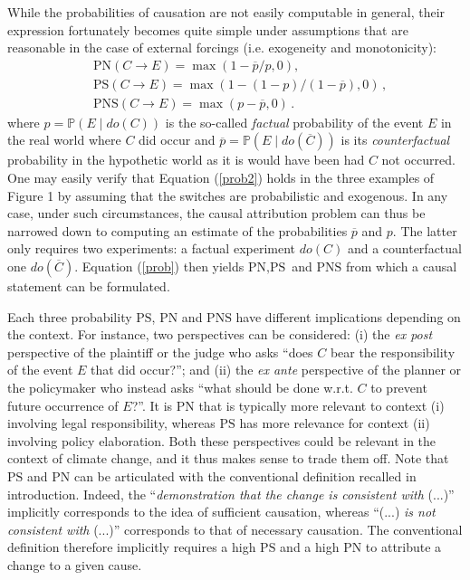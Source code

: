 \documentclass[12pt]{article}
\newcommand{\PN}{\textrm{PN}}
\newcommand{\DO}{do}
\newcommand{\PS}{\textrm{PS}}
\newcommand{\PNS}{\textrm{PNS}}
\newcommand{\Proba}{\mathbb P}
\begin{document}
While the probabilities of causation are not easily computable in general, their expression fortunately becomes quite simple under assumptions that are reasonable in the case of external forcings (i.e. exogeneity and monotonicity):
\begin{subequations}\label{prob2}
\begin{align}
& \textrm{PN}(C\rightarrow E) =\max \left(1 - \overline{p}/p, 0\right), \\%
& {\textrm{PS}}(C\rightarrow E) =\max \left(1- (1-p)/(1-\overline{p}), 0\right)\,, \\
& \textrm{PNS}(C\rightarrow E) = \max \left(p-\overline{p}, 0\right)\,.
\end{align}
\end{subequations}
where $p=\Proba(E\mid \DO(C))$ is the so-called \textit{factual} probability of the event $E$ in the real world where $C$ did occur and $\overline{p}=\Proba(E\mid \DO(\overline{C}))$ is its \textit{counterfactual} probability in the hypothetic world as it is would have been had $C$ not occurred. One may easily verify that Equation (\ref{prob2}) holds in the three examples of Figure 1 by assuming that the switches are probabilistic and exogenous. In any case, under such circumstances, the causal attribution problem can thus be narrowed down to computing an estimate of the probabilities $\overline{p}$ and $p$. The latter only requires two experiments: a factual experiment $\DO(C)$ and a counterfactual one $\DO(\overline{C})$. Equation (\ref{prob}) then yields $\textrm{PN}, \textrm{PS}$ and $\textrm{PNS}$ from which a causal statement can be formulated.

Each three probability $\PS$, $\PN$ and $\PNS$ have different implications depending on the context. For instance, two perspectives can be considered: (i) the \textit{ex post} perspective of the plaintiff or the judge who asks ``does $C$ bear the responsibility of the event $E$ that did occur?''; and (ii) the \textit{ex ante} perspective of the planner or the policymaker who instead asks ``what should be done w.r.t. $C$ to prevent future occurrence of $E$?''.  It is $\textrm{PN}$ that is typically more relevant to context (i) involving legal responsibility, whereas $\textrm{PS}$ has more relevance for context (ii) involving policy elaboration. Both these perspectives could be relevant in the context of climate change, and it thus makes sense to trade them off. Note that $\PS$ and $\PN$ can be articulated with the conventional definition recalled in introduction. Indeed, the ``\textit{demonstration that the change is consistent with} (...)'' implicitly corresponds to the idea of sufficient causation, whereas ``(...) \textit{is not consistent with} (...)'' corresponds to that of necessary causation. The conventional definition therefore implicitly requires a high $\PS$ and a high $\PN$ to attribute a change to a given cause.
\end{document}

